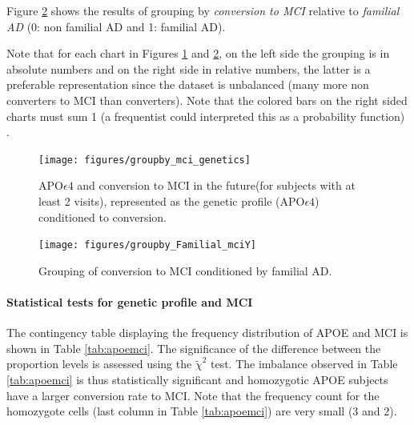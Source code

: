 \documentclass[11pt]{article}
\theoremstyle{definition}
\theoremstyle{remark}
\begin{document}
Figure \ref{fig:groupby_mci_fami} shows the results of grouping by \emph{conversion to MCI} relative to \emph{familial AD} (0: non familial AD and 1: familial AD).

Note that for each chart in Figures \ref{fig:groupby_mci_genetics} and  \ref{fig:groupby_mci_fami}, on the left side the grouping is in absolute numbers and on the right side in relative numbers, the latter is a preferable representation since the dataset is unbalanced (many more non converters to MCI than converters). Note that the colored bars on the right sided charts must sum 1 (a frequentist could interpreted this as a probability function) \cite{Gomez-ramirez_limitations_2013}. 
\begin{figure}[H]
        \centering
        \texttt{[image: figures/groupby\_mci\_genetics]}
        \caption{APO$\epsilon4$ and conversion to MCI in the future(for subjects with at least 2 visits), represented as the genetic profile (APO$\epsilon4$) conditioned to conversion.} 
        \label{fig:groupby_mci_genetics}
\end{figure}

\begin{figure}[H]
        \centering
        \texttt{[image: figures/groupby\_Familial\_mciY]}
        \caption{Grouping of conversion to MCI conditioned by familial AD.} 
        \label{fig:groupby_mci_fami}
\end{figure}

\paragraph*{Statistical tests for genetic profile and MCI}

The contingency table displaying the frequency distribution of APOE and MCI is shown in Table \ref{tab:apoemci}. The significance of the difference between the proportion levels is assessed using the $\tilde{\chi}^2$ test. The imbalance observed in Table \ref{tab:apoemci} is thus statistically significant and homozygotic APOE subjects have a larger conversion rate to MCI. Note that the frequency count for the homozygote cells (last column in Table \ref{tab:apoemci}) are very small (3 and 2). 
\end{document}
